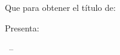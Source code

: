 \begin{titlepage}
\begin{addmargin}[-1cm]{-3cm}
\begin{minipage}[c][0.99\textheight][t]{0.9\textwidth}
\begin{center}
       \vspace{2cm}

        \begingroup
            \spacedallcaps{\myUni} \\ \bigskip
        \endgroup
        
        \vfil
        
        \begingroup
            \spacedallcaps{\myFaculty} \\ \bigskip
        \endgroup

        \hfill

        \vfill
        
        \begingroup
            \color{CTtitle}\spacedallcaps{\myTitle} \\ \bigskip
        \endgroup

        \vfill
        \\[1.2cm]
        
        Que para obtener el título de: \\ \bigskip
        \myDegree

        \vspace{1.4cm}
        Presenta: \\ \bigskip
        \spacedlowsmallcaps{\myName}

        \vfill


      

        \myTime\ -- \myVersion

        \vfill

        \end{center}
\end{minipage}
\end{addmargin}
\end{titlepage}